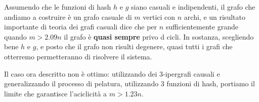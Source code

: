 \documentclass[\main/main.tex]{subfiles}
\begin{document}
\begin{observation}
    Assumendo che le funzioni di hash \(h\) e \(g\) siano casuali e indipendenti, il grafo che andiamo a costruire è un grafo casuale di \(m\) vertici con \(n\) archi, e un risultato importante di teoria dei grafi casuali dice che per \(n\) sufficientemente grande quando \(m > 2.09 n\) il grafo è \textbf{quasi sempre} privo d cicli. In sostanza, scegliendo bene \(h\) e \(g\), e posto che il grafo non risulti degenere, quasi tutti i grafi che otterremo permetteranno di risolvere il sistema.
\end{observation}
\begin{observation}
    Il caso ora descritto non è ottimo: utilizzando dei 3-ipergrafi causali e generalizzando il processo di pelatura, utilizzando \(3\) funzioni di hash, portiamo il limite che garantisce l'aciclicità a \(m > 1.23n\).
\end{observation}
\clearpage
\end{document}
